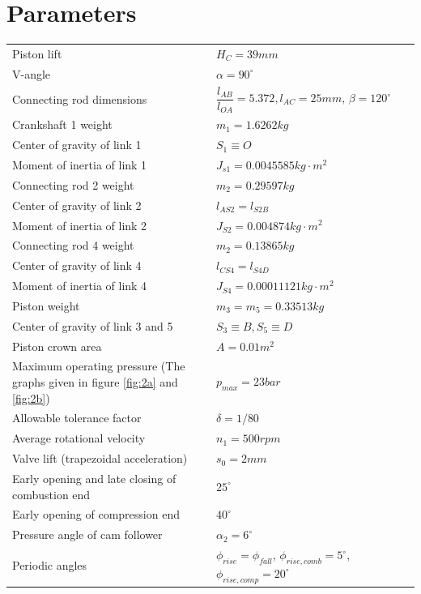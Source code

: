 \section{Parameters}
\begin{tabular}{p{0.5\linewidth}p{0.5\linewidth}}
	Piston lift & $ H_C=39\unit{mm} $\\
	V-angle&$ \alpha=90^\circ $\\
	Connecting rod dimensions  &$ \dfrac{l_{AB}}{l_{OA}} =5.372,l_{AC}=25mm$, $\beta=120^\circ$\\
	Crankshaft 1 weight&$ m_1=1.6262\unit{kg} $\\
	Center of gravity of link 1&$ S_1\equiv O $\\
	Moment of inertia of link 1&$ J_{s1}=0.0045585\unit{kg\cdot m^2} $\\
	Connecting rod 2 weight&$ m_2=0.29597\unit{kg} $\\
	Center of gravity of link 2&$ l_{AS2}=l_{S2B} $\\
	Moment of inertia of link 2&$ J_{S2}=0.004874\unit{kg\cdot m^2} $\\
	Connecting rod 4 weight&$ m_2=0.13865\unit{kg} $\\
	Center of gravity of link 4&$ l_{CS4}=l_{S4D} $\\
	Moment of inertia of link 4&$ J_{S4}=0.00011121\unit{kg\cdot m^2} $\\
	Piston weight&$ m_3=m_5=0.33513\unit{kg} $\\
	Center of gravity of link 3 and 5&$ S_3\equiv B, S_5\equiv D $\\
	Piston crown area&$ A=0.01\unit{m^2} $\\
	Maximum operating pressure (The graphs given in figure \ref{fig:2a} and \ref{fig:2b})&$ p_{max}=23\unit{bar} $\\
	Allowable tolerance factor&$ \delta=1/80 $\\
	Average rotational velocity&$ n_1=500\unit{rpm} $\\
	Valve lift (trapezoidal acceleration)&$ s_0=2\unit{mm} $ \\
	Early opening and late closing of combustion end&$ 25^\circ $\\
	Early opening of compression end&$ 40^\circ $\\
	Pressure angle of cam follower&$ \alpha_2=6^\circ $\\
	Periodic angles&$ \phi_{rise}=\phi_{fall}$, $\phi_{rise,comb}=5^\circ$, $\phi_{rise,comp}=20^\circ $
\end{tabular}
